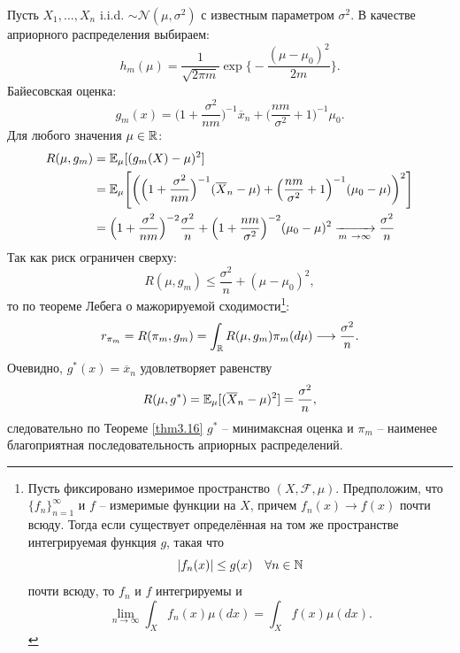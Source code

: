 \begin{exmp}
	Пусть $X_1, \dots, X_n$ i.i.d. $\sim \mathcal{N}(\mu, \sigma^2)$ с известным параметром $\sigma^2$. В качестве априорного распределения выбираем:
	\[ h_m(\mu)=\frac{1}{\sqrt{2 \pi m}} \exp \Big \{ -\frac{(\mu-\mu_0)^2}{2m}\Big \}. \]
	Байесовская оценка:
	\[ g_m(x)=\Big( 1 + \frac{\sigma^2}{n m} \Big)^{-1} \overline{x}_n+\Big( \frac{n m}{\sigma^2}+1 \Big)^{-1} \mu_0.\]
	Для любого значения $\mu \in \mathbb{R}$:
	\[  
	\begin{aligned}
	R(\mu, g_m) & = \ME_\mu[(g_m(X)-\mu)^2] \\
	& = \ME_\mu\Bigg[\bigg(\Big( 1 + \frac{\sigma^2}{n m} \Big)^{-1} (\overline{X}_n-\mu)+\Big( \frac{n m}{\sigma^2}+1 \Big)^{-1} (\mu_0-\mu)\bigg)^2\Bigg] \\
	& = \Big(1 + \frac{\sigma^2}{nm}\Big)^{-2} \frac{\sigma^2}{n} + \Big( 1+\frac{nm}{\sigma^2} \Big)^{-2}(\mu_0-\mu)^2 \xrightarrow[m \ \rightarrow \infty]{} \frac{\sigma^2}{n}
	\end{aligned}
	\]
	Так как риск ограничен сверху:
	\[ R(\mu, g_m) \leq \frac{\sigma^2}{n} + (\mu - \mu_0)^2, \]
	то по теореме Лебега о мажорируемой сходимости\footnote{
		Пусть фиксировано измеримое пространство $(X, \mathcal{F}, \mu)$. Предположим, что $\{ f_n \}_{n=1}^\infty$ и $f$ -- измеримые функции на $X$, причем $f_n(x) \rightarrow f(x)$ почти всюду. Тогда если существует определённая на том же пространстве интегрируемая функция $g$, такая что
		\[ |f_n(x)| \leq g(x) \quad \forall n \in \mathbb{N} \]
		почти всюду, то $f_n$ и $f$ интегрируемы и
		\[ \lim\limits_{n \rightarrow \infty} \int_X f_n(x) \mu(dx) = \int_X f(x) \mu(dx). \]
		}:
	\[ r_{\pi_m}=R(\pi_m, g_m)=\int_{\mathbb{R}}R(\mu, g_m)\pi_m(d\mu) \longrightarrow \frac{\sigma^2}{n}. \]
	Очевидно, $g^*(x)=\overline{x}_n$ удовлетворяет равенству
	\[ R(\mu, g^*)=\mathbb{E}_\mu[(\overline{X}_n-\mu)^2]=\frac{\sigma^2}{n}, \]
	следовательно по Теореме \ref{thm3.16} $g^*$ -- минимаксная оценка и $\pi_m$ -- наименее благоприятная последовательность априорных распределений.
\end{exmp}

\raggedbottom
\pagebreak

